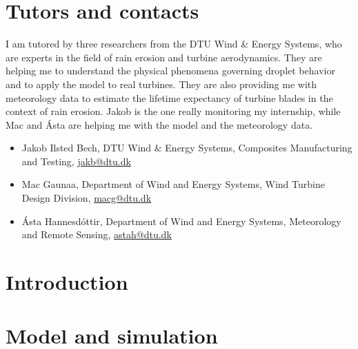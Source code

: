 \documentclass[10pt]{report}
\begin{document}
\section*{Tutors and contacts}
I am tutored by three researchers from the DTU Wind \& Energy Systems, who are experts in the field of rain erosion and turbine aerodynamics. They are helping me to understand the physical phenomena governing droplet behavior and to apply the model to real turbines. They are also providing me with meteorology data to estimate the lifetime expectancy of turbine blades in the context of rain erosion. Jakob is the one really monitoring my internship, while Mac and Ásta are helping me with the model and the meteorology data.
\begin{itemize}
    \item Jakob Ilsted Bech, DTU Wind \& Energy Systems, Composites Manufacturing and Testing, \url{jakb@dtu.dk} \
    \item Mac Gaunaa, Department of Wind and Energy Systems, Wind Turbine Design Division, \url{macg@dtu.dk}\
    \item Ásta Hannesdóttir, Department of Wind and Energy Systems, Meteorology and Remote Sensing, \url{astah@dtu.dk}
\end{itemize}

\newpage

\section*{Introduction}

\section*{Model and simulation}
\end{document}
